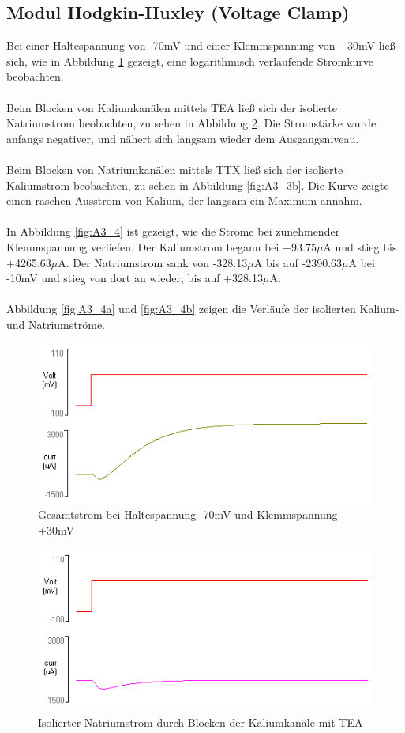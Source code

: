 \documentclass[a4paper]{article}
\begin{document}
\subsection{Modul Hodgkin-Huxley (Voltage Clamp)}
Bei einer Haltespannung von -70mV und einer Klemmspannung von +30mV ließ sich, wie in Abbildung \ref{fig:A3_2} gezeigt, eine logarithmisch verlaufende Stromkurve beobachten.\\ \\
Beim Blocken von Kaliumkanälen mittels TEA ließ sich der isolierte Natriumstrom beobachten, zu sehen in Abbildung \ref{fig:A3_3a}. Die Stromstärke wurde anfangs negativer, und nähert sich langsam wieder dem Ausgangsniveau.\\ \\
Beim Blocken von Natriumkanälen mittels TTX ließ sich der isolierte Kaliumstrom beobachten, zu sehen in Abbildung \ref{fig:A3_3b}. Die Kurve zeigte einen raschen Ausstrom von Kalium, der langsam ein Maximum annahm.\\ \\
In Abbildung \ref{fig:A3_4} ist gezeigt, wie die Ströme bei zunehmender Klemmspannung verliefen. Der Kaliumstrom begann bei +93.75\(\mu\)A und stieg bis +4265.63\(\mu\)A. Der Natriumstrom sank von -328.13\(\mu\)A bis auf -2390.63\(\mu\)A bei -10mV und stieg von dort an wieder, bis auf +328.13\(\mu\)A.\\ \\
Abbildung \ref{fig:A3_4a} und \ref{fig:A3_4b} zeigen die Verläufe der isolierten Kalium- und Natriumströme.
\begin{figure}[H]
    \centering
    \includegraphics{images/Aufgabe3_2.png}
    \caption{Gesamtstrom bei Haltespannung -70mV und Klemmspannung +30mV}
    \label{fig:A3_2}
\end{figure}
\begin{figure}[H]
  \centering
  \includegraphics{images/Aufgabe3_3-TEA_Na_Detail.png}
  \caption{Isolierter Natriumstrom durch Blocken der Kaliumkanäle mit TEA}
  \label{fig:A3_3a}
\end{figure}
\end{document}
